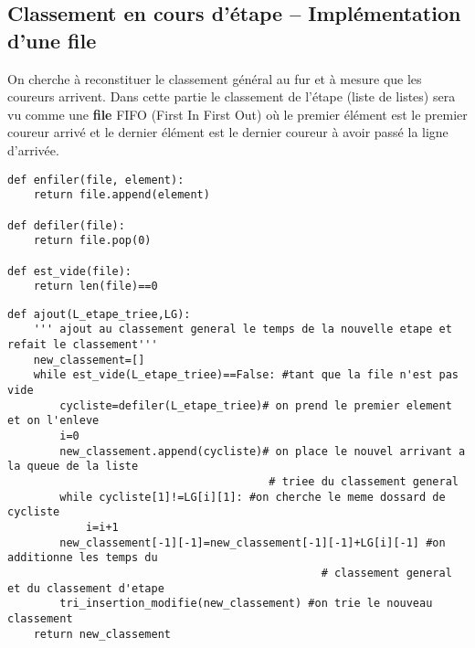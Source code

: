 \subsection*{Classement en cours d'étape -- Implémentation d'une file}
On cherche à reconstituer le classement général au fur et à mesure que les coureurs arrivent. Dans cette partie le classement de l'étape (liste de listes) sera vu comme une \textbf{file} FIFO (First In First Out) où le premier élément est le premier coureur arrivé et le dernier élément est le dernier coureur à avoir passé la ligne d'arrivée.  

\ifprof
\begin{lstlisting}
def enfiler(file, element):
    return file.append(element)

def defiler(file):
    return file.pop(0)

def est_vide(file):
    return len(file)==0
\end{lstlisting}
\else\fi


\ifprof
\begin{lstlisting}
def ajout(L_etape_triee,LG):
    ''' ajout au classement general le temps de la nouvelle etape et refait le classement'''
    new_classement=[]
    while est_vide(L_etape_triee)==False: #tant que la file n'est pas vide
        cycliste=defiler(L_etape_triee)# on prend le premier element et on l'enleve
        i=0
        new_classement.append(cycliste)# on place le nouvel arrivant a la queue de la liste
                                        # triee du classement general
        while cycliste[1]!=LG[i][1]: #on cherche le meme dossard de cycliste
            i=i+1
        new_classement[-1][-1]=new_classement[-1][-1]+LG[i][-1] #on additionne les temps du
                                                # classement general et du classement d'etape
        tri_insertion_modifie(new_classement) #on trie le nouveau classement
    return new_classement
\end{lstlisting}
\else\fi


\ifprof
\begin{lstlisting}
\end{lstlisting}
\else\fi

